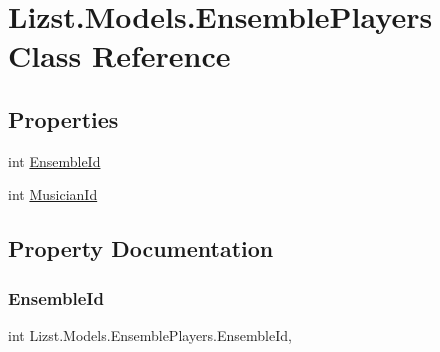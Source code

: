 \hypertarget{class_lizst_1_1_models_1_1_ensemble_players}{}\section{Lizst.\+Models.\+Ensemble\+Players Class Reference}
\label{class_lizst_1_1_models_1_1_ensemble_players}
\subsection*{Properties}
\begin{DoxyCompactItemize}
\item 
int \mbox{\hyperlink{class_lizst_1_1_models_1_1_ensemble_players_af8322c74a43f9400591798e9f91a98c3}{Ensemble\+Id}}
\item 
int \mbox{\hyperlink{class_lizst_1_1_models_1_1_ensemble_players_a00ab7e64a5e411dafddf496e9f6219dd}{Musician\+Id}}
\end{DoxyCompactItemize}


\subsection{Property Documentation}
\mbox{\label{class_lizst_1_1_models_1_1_ensemble_players_af8322c74a43f9400591798e9f91a98c3}} 
\subsubsection{\texorpdfstring{EnsembleId}{EnsembleId}}
{\footnotesize\ttfamily int Lizst.\+Models.\+Ensemble\+Players.\+Ensemble\+Id\hspace{0.3cm}{\ttfamily [get]}, {\ttfamily [set]}}

\mbox{\label{class_lizst_1_1_models_1_1_ensemble_players_a00ab7e64a5e411dafddf496e9f6219dd}} 
